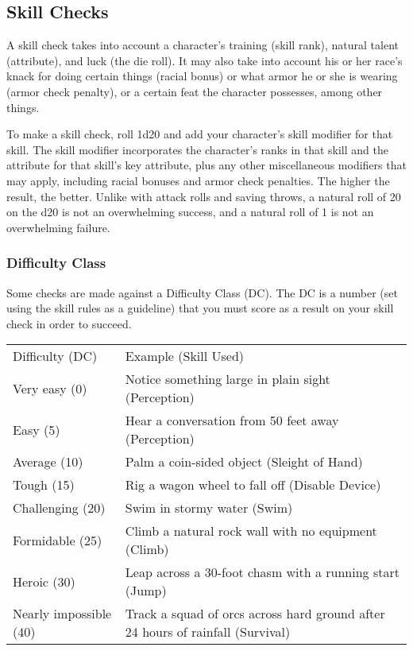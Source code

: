 \subsection{Skill Checks}
A skill check takes into account a character's training (skill rank), natural talent (attribute), and luck (the die roll). It may also take into account his or her race's knack for doing certain things (racial bonus) or what armor he or she is wearing (armor check penalty), or a certain feat the character possesses, among other things.

To make a skill check, roll 1d20 and add your character's skill modifier for that skill. The skill modifier incorporates the character's ranks in that skill and the attribute for that skill's key attribute, plus any other miscellaneous modifiers that may apply, including racial bonuses and armor check penalties. The higher the result, the better. Unlike with attack rolls and saving throws, a natural roll of 20 on the d20 is not an overwhelming success, and a natural roll of 1 is not an overwhelming failure.

\subsubsection{Difficulty Class}
Some checks are made against a Difficulty Class (DC). The DC is a number (set using the skill rules as a guideline) that you must score as a result on your skill check in order to succeed.

\begin{dtable}
\begin{tabularx}{\columnwidth}{p{8em} X}
Difficulty (DC) & Example (Skill Used) \\
Very easy (0) & Notice something large in plain sight (Perception) \\
Easy (5) & Hear a conversation from 50 feet away (Perception) \\
Average (10) & Palm a coin-sided object (Sleight of Hand) \\
Tough (15) & Rig a wagon wheel to fall off (Disable Device) \\
Challenging (20) & Swim in stormy water (Swim) \\
Formidable (25) & Climb a natural rock wall with no equipment (Climb) \\
Heroic (30) & Leap across a 30-foot chasm with a running start (Jump) \\
Nearly impossible (40) & Track a squad of orcs across hard ground after 24 hours of rainfall (Survival) \\
\end{tabularx}
\end{dtable}

